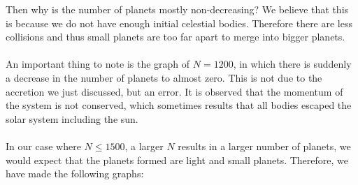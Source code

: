 Then why is the number of planets mostly non-decreasing? We believe that this is because we do not have enough initial celestial bodies. Therefore there are less collisions and thus small planets are too far apart to merge into bigger planets.\\
\\
An important thing to note is the graph of $N=1200$, in which there is suddenly a decrease in the number of planets to almost zero. This is not due to the accretion we just discussed, but an error. It is observed that the momentum of the system is not conserved, which sometimes results that all bodies escaped the solar system including the sun.\\
\\
In our case where $N\leq 1500$, a larger $N$ results in a larger number of planets, we would expect that the planets formed are light and small planets. Therefore, we have made the following graphs:
